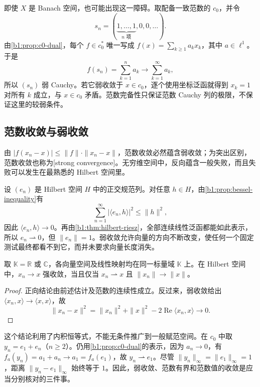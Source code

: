 即使 \(X\) 是 Banach 空间，也可能出现这一障碍。取配备一致范数的 \(c_0\)，并令
\[
 s_n=(\underbrace{1,\ldots,1}_{n\text{ 项}},0,0,\ldots).
\]
由\cref{b1:prop:c0-dual}，每个 \(f\in c_0^*\) 唯一写成 \(f(x)=\sum_{k\geq1}a_kx_k\)，其中 \(a\in\ell^1\)。于是
\[
 f(s_n)=\sum_{k=1}^n a_k\longrightarrow\sum_{k=1}^{\infty}a_k,
\]
所以 \((s_n)\) 弱 Cauchy。若它弱收敛于 \(x\in c_0\)，逐个使用坐标泛函就得到 \(x_k=1\) 对所有 \(k\) 成立，与 \(x\in c_0\) 矛盾。范数完备性只保证范数 Cauchy 列的极限，不保证这里的较弱条件。

\subsection{范数收敛与弱收敛}
\label{b1:subsec:090104}

由 \(|f(x_n-x)|\leq\|f\|\cdot\|x_n-x\|\)，范数收敛必然蕴含弱收敛；为突出区别，范数收敛也称为[strong convergence]。无穷维空间中，反向蕴含一般失败，而且失败可以发生在最熟悉的 Hilbert 空间里。

\ProseParagraphBreak

设 \((e_n)\) 是 Hilbert 空间 \(H\) 中的正交规范列。对任意 \(h\in H\)，由\cref{b1:prop:bessel-inequality}有
\[
 \sum_{n=1}^{\infty}|\langle e_n,h\rangle|^2\leq\|h\|^2,
\]
因此 \(\langle e_n,h\rangle\to0\)。再由\cref{b1:thm:hilbert-riesz}，全部连续线性泛函都能如此表示，所以 \(e_n\rightharpoonup0\)，但 \(\|e_n\|=1\)。弱收敛允许向量的方向不断改变，使任何一个固定测试最终都看不到它，而并未要求向量长度消失。

\begin{proposition}\label{b1:prop:hilbert-weak-norm-convergence}
取 \(\mathbb K=\mathbb R\) 或 \(\mathbb C\)，各向量空间及线性映射均在同一标量域 \(\mathbb K\) 上。在 Hilbert 空间中，\(x_n\to x\) 强收敛，当且仅当 \(x_n\rightharpoonup x\) 且 \(\|x_n\|\to\|x\|\)。
\end{proposition}
\begin{proof}
正向结论由前述估计及范数的连续性成立。反过来，弱收敛给出 \(\langle x_n,x\rangle\to\langle x,x\rangle\)，故
\[
 \|x_n-x\|^2
 =\|x_n\|^2+\|x\|^2-2\operatorname{Re}\langle x_n,x\rangle
 \longrightarrow0.
\]
\end{proof}

这个结论利用了内积恒等式，不能无条件推广到一般赋范空间。在 \(c_0\) 中取 \(y_n=e_1+e_n\)（\(n\geq2\)）。仍用\cref{b1:prop:c0-dual}的表示，因为 \(a_n\to0\)，有 \(f_a(y_n)=a_1+a_n\to a_1=f_a(e_1)\)，故 \(y_n\rightharpoonup e_1\)。尽管 \(\|y_n\|_\infty=\|e_1\|_\infty=1\)，距离 \(\|y_n-e_1\|_\infty\) 始终等于 \(1\)。因此，弱收敛、范数有界和范数值的收敛是应当分别核对的三件事。
